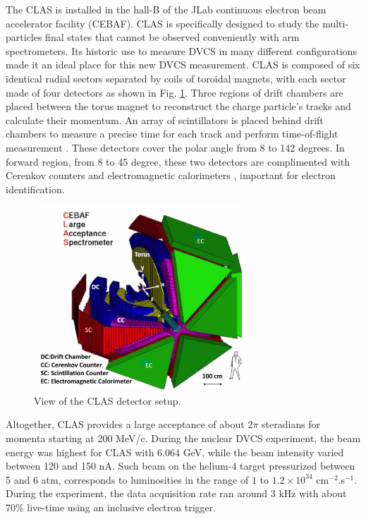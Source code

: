 \documentclass[aps,prc,preprint,superscriptaddress]{revtex4}
\begin{document}
The CLAS \cite{Mecking:2003zu} is installed in the hall-B of the JLab continuous electron beam 
accelerator facility (CEBAF). CLAS is specifically designed to study the multi-particles final states
that cannot be observed conveniently with arm spectrometers. Its historic use to measure DVCS in many different 
configurations made it an ideal place for this new DVCS measurement. CLAS is composed of six identical radial 
sectors separated by coils of toroidal magnets, with each sector made of four detectors 
as shown in Fig. \ref{fig:CLAS}.  Three regions of drift chambers \cite{Mestayer:2000we} 
are placed between the torus magnet to reconstruct the charge particle's tracks and 
calculate their momentum. An array of scintillators is placed behind drift chambers to measure 
a precise time for each track and perform time-of-flight measurement 
\cite{Smith:1999ii}. These detectors cover the polar angle from 8 to 142 degrees. 
In forward region, from 8 to 45 degree, these two detectors are complimented with 
Cerenkov counters \cite{Adams:2001kk} and electromagnetic calorimeters \cite{Amarian:2001zs},
important for electron identification. 

\begin{figure}[tbp!]
\center
\includegraphics[width=8cm]{fig3/CLAS_geantview-PS.jpg}
	\caption{View of the CLAS detector setup.}
\label{fig:CLAS}
\end{figure}


Altogether, CLAS provides a large acceptance of about $2\pi$ steradians for momenta 
starting at 200 MeV/c. During the nuclear DVCS experiment,
the beam energy was highest for CLAS with 6.064 GeV, while the beam intensity varied
between 120 and 150 nA. Such beam on the helium-4 target pressurized between 5 and 6 atm,
corresponds to luminosities in the range of $1$ to $1.2 \times 10^{34}$ cm$^{-2}$.s$^{-1}$.
During the experiment, the data acquisition rate ran around 3 kHz with about 70\% live-time
using an inclusive electron trigger. 
\end{document}

